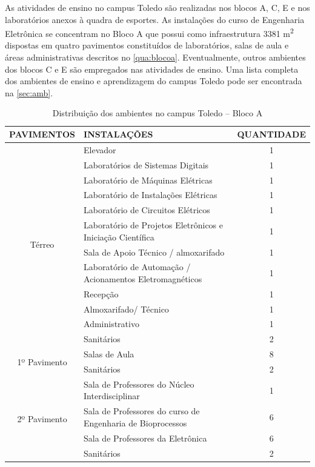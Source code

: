 As atividades de ensino no campus Toledo são realizadas nos blocos A, C, E e nos laboratórios anexos à quadra de esportes. As instalações do curso de Engenharia Eletrônica se concentram no Bloco A que possui como infraestrutura 3381 m\textsuperscript{2} dispostas em quatro pavimentos constituídos de laboratórios, salas de aula e áreas administrativas descritos no \autoref{qua:blocoa}. Eventualmente, outros ambientes dos blocos C e E são empregados nas atividades de ensino. Uma lista completa dos ambientes de ensino e aprendizagem do campus Toledo pode ser encontrada na \autoref{sec:amb}.

\begin{table}
    \centering\small
	\caption[Distribuição dos ambientes no campus Toledo – Bloco A]{Distribuição dos ambientes no campus Toledo – Bloco A}
    \begin{tabularx}{\textwidth}{c >{\centering\arraybackslash}X  c}
        \toprule
        PAVIMENTOS & INSTALAÇÕES & QUANTIDADE \\ \midrule \midrule

        \multirow{12}{*}{ Térreo } & Elevador & 1 \\
        & Laboratórios de Sistemas Digitais & 1 \\
        & Laboratório de Máquinas Elétricas & 1 \\
        & Laboratório de Instalações Elétricas & 1 \\
        & Laboratório de Circuitos Elétricos & 1 \\
        & Laboratório de Projetos Eletrônicos e Iniciação Científica & 1 \\
        & Sala de Apoio Técnico / almoxarifado & 1 \\
        & Laboratório de Automação / Acionamentos Eletromagnéticos & 1 \\
        & Recepção & 1 \\
        & Almoxarifado/ Técnico & 1 \\
        & Administrativo & 1 \\
        & Sanitários & 2 \\ \midrule

        \multirow{2}{*}{ 1º Pavimento } & Salas de Aula & 8 \\
        & Sanitários & 2 \\ \midrule

        \multirow{4}{*}{ 2º Pavimento } & Sala de Professores do Núcleo Interdisciplinar & 1 \\
        & Sala de Professores do curso de Engenharia de Bioprocessos & 6 \\
        & Sala de Professores da Eletrônica & 6 \\
        & Sanitários & 2 \\ \midrule


\end{tabularx}
\end{table}
